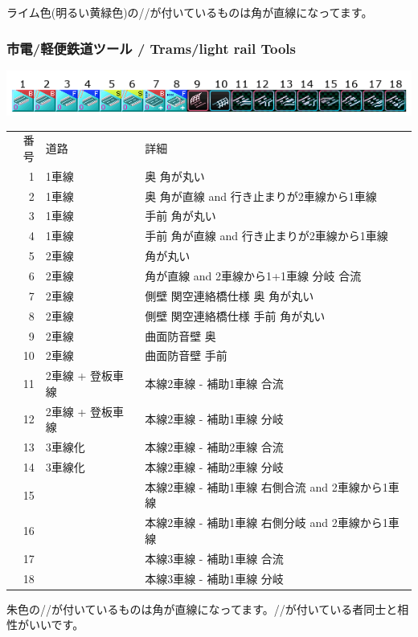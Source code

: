 \documentclass{jbook}
\begin{document}
\vspace{5pt}
ライム色(明るい黄緑色)の//が付いているものは角が直線になってます。

\newpage

\subsubsection*{市電/軽便鉄道ツール / Trams/light rail Tools}
\begin{flushleft}
  \includegraphics{picture/menu-2-1.png}
\end{flushleft}
\begin{tabular}{rll}
  番号 & 道路 & 詳細 \\
  1 & 1車線 & 奥 角が丸い \\
  2 & 1車線 & 奥 角が直線 and 行き止まりが2車線から1車線 \\
  3 & 1車線 & 手前 角が丸い \\
  4 & 1車線 & 手前 角が直線 and 行き止まりが2車線から1車線 \\
  5 & 2車線 & 角が丸い \\
  6 & 2車線 & 角が直線 and 2車線から1+1車線 分岐 合流 \\
  7 & 2車線 & 側壁 関空連絡橋仕様 奥 角が丸い \\
  8 & 2車線 & 側壁 関空連絡橋仕様 手前 角が丸い \\
  9 & 2車線 & 曲面防音壁 奥\\
  10 & 2車線 & 曲面防音壁 手前\\
  11 & 2車線 + 登板車線 & 本線2車線 - 補助1車線 合流\\
  12 & 2車線 + 登板車線 & 本線2車線 - 補助1車線 分岐\\
  13 & 3車線化 & 本線2車線 - 補助2車線 合流\\
  14 & 3車線化 & 本線2車線 - 補助2車線 分岐\\
  15 & & 本線2車線 - 補助1車線 右側合流 and 2車線から1車線\\
  16 & & 本線2車線 - 補助1車線 右側分岐 and 2車線から1車線\\
  17 & & 本線3車線 - 補助1車線 合流\\
  18 & & 本線3車線 - 補助1車線 分岐\\
\end{tabular}

\vspace{5pt}
朱色の//が付いているものは角が直線になってます。//が付いている者同士と相性がいいです。
\end{document}
